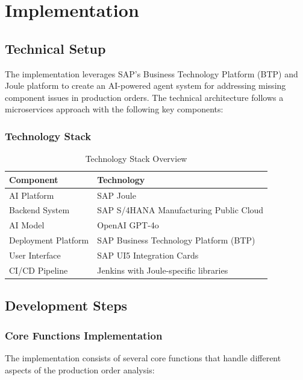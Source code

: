 \chapter{Implementation}
\label{chap:Implementation}

\section{Technical Setup}

The implementation leverages SAP's Business Technology Platform (BTP) and Joule platform to create an AI-powered agent system for addressing missing component issues in production orders. The technical architecture follows a microservices approach with the following key components:

\subsection{Technology Stack}

\begin{table}[h]
\centering
\begin{tabular}{@{}ll@{}}
\toprule
\textbf{Component} & \textbf{Technology} \\
\midrule
AI Platform & SAP Joule \\
Backend System & SAP S/4HANA Manufacturing Public Cloud \\
AI Model & OpenAI GPT-4o \\
Deployment Platform & SAP Business Technology Platform (BTP) \\
User Interface & SAP UI5 Integration Cards \\
CI/CD Pipeline & Jenkins with Joule-specific libraries \\
\bottomrule
\end{tabular}
\caption{Technology Stack Overview}
\end{table}


\section{Development Steps}

\subsection{Core Functions Implementation}

The implementation consists of several core functions that handle different aspects of the production order analysis:

